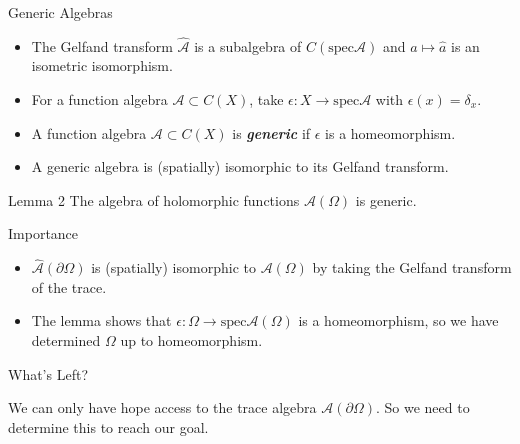 \documentclass[aspectratio=169]{beamer}
\newcommand\boldgreen[1]{\textcolor{lighter_csu_green}{\emph{\textbf{#1}}}}
\newcommand{\algebra}{\mathcal{A}}
\newcommand{\spec}{\mathrm{spec}}
\begin{document}
\begin{frame}{Generic Algebras}
\vfill
    \begin{itemize}
        \pause
        \item The Gelfand transform $\hat{\algebra}$ is a subalgebra of $C(\spec \algebra)$ and $a\mapsto \hat{a}$ is an isometric isomorphism.
        
        
        \pause
        \item For a function algebra $\algebra \subset C(X)$, take $\epsilon \colon X \to \spec \algebra$ with $\epsilon(x)=\delta_x$.
        
        \pause
        \item A function algebra $\algebra \subset C(X)$ is \boldgreen{generic} if $\epsilon$ is a homeomorphism. 
        
        \pause
        \item A generic algebra is (spatially) isomorphic to its Gelfand transform.
        
    \end{itemize}
\vfill
\end{frame}

\begin{frame}{Lemma 2}
\vfill
\pause
    The algebra of holomorphic functions $\algebra(\Omega)$ is generic.
\vfill
\end{frame}

\begin{frame}{Importance}
\vfill
    \begin{itemize}       
        \pause
        \item $\hat{\algebra}(\partial \Omega)$ is (spatially) isomorphic to $\algebra(\Omega)$ by taking the Gelfand transform of the trace.
        
        \pause
        \item The lemma shows that $\epsilon \colon \Omega \to \spec \algebra(\Omega)$ is a homeomorphism, so we have determined $\Omega$ up to homeomorphism.
    \end{itemize}
\vfill
\end{frame}

\begin{frame}{What's Left?}
\vfill
\pause

    We can only have hope access to the trace algebra $\algebra(\partial \Omega)$. So we need to determine this to reach our goal.
    \vfill
\end{frame}
\end{document}
